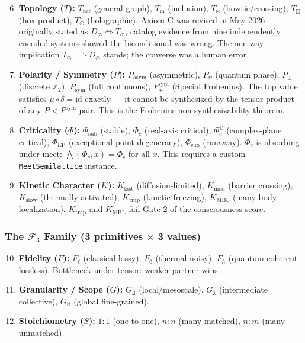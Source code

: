 \documentclass[12pt,a4paper]{article}
\begin{document}
\begin{enumerate}
\setcounter{enumi}{5}
    \item \textbf{Topology ($T$):} $T_\text{net}$ (general graph), $T_\text{in}$ (inclusion), $T_{\bowtie}$ (bowtie/crossing), $T_{\boxtimes}$ (box product), $T_{\odot}$ (holographic). Axiom C was revised in May 2026 --- originally stated as $D_{\odot} \iff T_{\odot}$, catalog evidence from nine independently encoded systems showed the biconditional was wrong. The one-way implication $T_{\odot} \implies D_{\odot}$ stands; the converse was a human error.
    \item \textbf{Polarity / Symmetry ($P$):} $P_\text{asym}$ (asymmetric), $P_{\psi}$ (quantum phase), $P_{\pm}$ (discrete $\mathbb{Z}_2$), $P_\text{sym}$ (full continuous), $P_{\pm}^{\text{sym}}$ (Special Frobenius). The top value satisfies $\mu \circ \delta = \text{id}$ exactly --- it cannot be synthesized by the tensor product of any $P < P_{\pm}^{\text{sym}}$ pair. This is the Frobenius non-synthesizability theorem.
    \item \textbf{Criticality ($\Phi$):} $\Phi_\text{sub}$ (stable), $\Phi_c$ (real-axis critical), $\Phi_c^\mathbb{C}$ (complex-plane critical), $\Phi_\text{EP}$ (exceptional-point degeneracy), $\Phi_\text{sup}$ (runaway). $\Phi_c$ is absorbing under meet: $\bigwedge(\Phi_c, x) = \Phi_c$ for all $x$. This requires a custom \texttt{MeetSemilattice} instance.
    \item \textbf{Kinetic Character ($K$):} $K_\text{fast}$ (diffusion-limited), $K_\text{mod}$ (barrier crossing), $K_\text{slow}$ (thermally activated), $K_\text{trap}$ (kinetic freezing), $K_\text{MBL}$ (many-body localization). $K_\text{trap}$ and $K_\text{MBL}$ fail Gate 2 of the consciousness score.
\end{enumerate}

\subsubsection{The $\mathcal{F}_3$ Family (3 primitives $\times$ 3 values)}

\begin{enumerate}
\setcounter{enumi}{9}
    \item \textbf{Fidelity ($F$):} $F_{\ell}$ (classical lossy), $F_{\eth}$ (thermal-noisy), $F_{\hbar}$ (quantum-coherent lossless). Bottleneck under tensor: weaker partner wins.
    \item \textbf{Granularity / Scope ($G$):} $G_{\beth}$ (local/mesoscale), $G_{\gimel}$ (intermediate collective), $G_{\aleph}$ (global fine-grained).
    \item \textbf{Stoichiometry ($S$):} $1{:}1$ (one-to-one), $n{:}n$ (many-matched), $n{:}m$ (many-unmatched).---
\end{enumerate}
\end{document}
